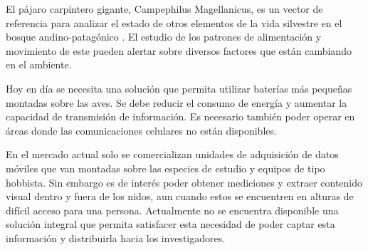 El pájaro carpintero gigante, Campephilus Magellanicus, es un vector de referencia para analizar el estado de otros elementos de la vida silvestre en el bosque andino-patagónico \cite{ref:PaperValeriaOjeda}. El estudio de los patrones de alimentación y movimiento de este pueden alertar sobre diversos factores que están cambiando en el ambiente.

Hoy en día se necesita una solución que permita utilizar baterías más pequeñas montadas sobre las aves. Se debe reducir el consumo de energía y aumentar la capacidad de transmisión de información. Es necesario también poder operar en áreas donde las comunicaciones celulares no están disponibles.

En el mercado actual solo se comercializan unidades de adquisición de datos móviles que van montadas sobre las especies de estudio y equipos de tipo hobbista. Sin embargo es de interés poder obtener mediciones y extraer contenido visual dentro y fuera de los nidos, aun cuando estos se encuentren en alturas de difícil acceso para una persona. Actualmente no se encuentra disponible una solución integral que permita satisfacer esta necesidad de poder captar esta información y distribuirla hacia los investigadores.

%

